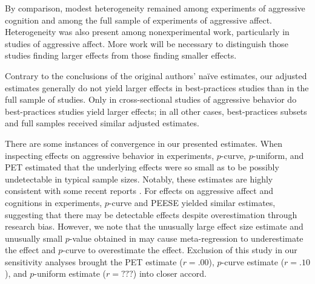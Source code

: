 \documentclass[man, mask]{apa6}
\begin{document}
By comparison, modest heterogeneity remained among experiments of aggressive cognition and among the full sample of experiments of aggressive affect. Heterogeneity was also present among nonexperimental work, particularly in studies of aggressive affect. More work will be necessary to distinguish those studies finding larger effects from those finding smaller effects.

Contrary to the conclusions of the original authors' na{\"i}ve estimates, our adjusted estimates generally do not yield larger effects in best-practices studies than in the full sample of studies. Only in cross-sectional studies of aggressive behavior do best-practices studies yield larger effects; in all other cases, best-practices subsets and full samples received similar adjusted estimates. 

There are some instances of convergence in our presented estimates. When inspecting effects on aggressive behavior in experiments, $p$-curve, $p$-uniform, and PET estimated that the underlying effects were so small as to be possibly undetectable in typical sample sizes. Notably, these estimates are highly consistent with some recent reports \citep{Engelhardt:etal:2015,Kneer:etal:inpress,Tear:Nielsen:2014,Przybylski:etal:2014}. For effects on aggressive affect and cognitions in experiments, $p$-curve and PEESE yielded similar estimates, suggesting that there may be detectable effects despite overestimation through research bias. However, we note that the unusually large effect size estimate and unusually small $p$-value obtained in \citet{Ballard:Wiest:1996} may cause meta-regression to underestimate the effect and $p$-curve to overestimate the effect. Exclusion of this study in our sensitivity analyses brought the PET estimate ($r = .00$), $p$-curve estimate ($r = .10$), and $p$-uniform estimate ($r = ???$) into closer accord.


\end{document}
